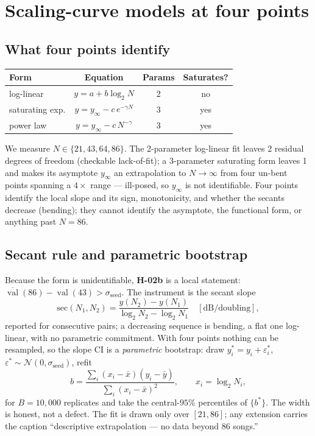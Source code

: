 \documentclass[11pt]{article}
\newcommand{\val}{\operatorname{val}}
\begin{document}
\section{Scaling-curve models at four points}

\subsection{What four points identify}

\begin{center}
\begin{tabular}{lccc}
\hline
Form & Equation & Params & Saturates?\\
\hline
log-linear & $y=a+b\log_2 N$ & 2 & no\\
saturating exp. & $y=y_\infty-c\,e^{-\gamma N}$ & 3 & yes\\
power law & $y=y_\infty-c\,N^{-\gamma}$ & 3 & yes\\
\hline
\end{tabular}
\end{center}

We measure $N\in\{21,43,64,86\}$. The 2-parameter log-linear fit leaves 2 residual
degrees of freedom (checkable lack-of-fit); a 3-parameter saturating form leaves 1
and makes its asymptote $y_\infty$ an extrapolation to $N\to\infty$ from four un-bent
points spanning a $4\times$ range --- ill-posed, so $y_\infty$ is not identifiable.
Four points identify the local slope and its sign, monotonicity, and whether the
secants decrease (bending); they cannot identify the asymptote, the functional form,
or anything past $N=86$.

\subsection{Secant rule and parametric bootstrap}

Because the form is unidentifiable, \textbf{H-02b} is a local statement:
$\overline{\val}(86)-\val(43)>\sigma_{\text{seed}}$. The instrument is the secant slope
\[
\mathrm{sec}(N_1,N_2)=\frac{y(N_2)-y(N_1)}{\log_2 N_2-\log_2 N_1}\quad[\text{dB/doubling}],
\]
reported for consecutive pairs; a decreasing sequence is bending, a flat one
log-linear, with no parametric commitment. With four points nothing can be resampled,
so the slope CI is a \emph{parametric} bootstrap: draw
$y_i^{*}=y_i+\varepsilon_i^{*}$, $\varepsilon^{*}\sim\mathcal N(0,\sigma_{\text{seed}})$,
refit
\[
b=\frac{\sum_i(x_i-\bar x)(y_i-\bar y)}{\sum_i(x_i-\bar x)^2},\qquad x_i=\log_2 N_i,
\]
for $B=10{,}000$ replicates and take the central-$95\%$ percentiles of
$\{b^{*}\}$. The width is honest, not a defect. The fit is drawn only over $[21,86]$;
any extension carries the caption ``descriptive extrapolation --- no data beyond 86
songs.''
\end{document}
